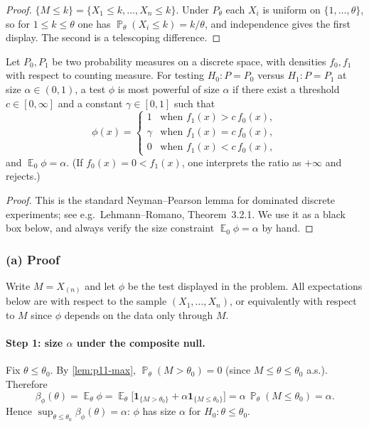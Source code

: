 \documentclass[11pt,a4paper]{article}
\DeclareMathOperator{\E}{\mathbb{E}}
\DeclareMathOperator{\Pbb}{\mathbb{P}}
\begin{document}
\begin{proof}
\(\{M\le k\}=\{X_1\le k,\dots,X_n\le k\}\). Under \(P_\theta\) each \(X_i\) is uniform on \(\{1,\dots,\theta\}\), so for \(1\le k\le\theta\) one has \(\Pbb_\theta(X_i\le k)=k/\theta\), and independence gives the first display. The second is a telescoping difference.
\end{proof}

\begin{lemma}
\label{lem:p11-NP}
Let \(P_0,P_1\) be two probability measures on a discrete space, with densities \(f_0,f_1\) with respect to counting measure. For testing \(H_0:P=P_0\) versus \(H_1:P=P_1\) at size \(\alpha\in(0,1)\), a test \(\phi\) is most powerful of size \(\alpha\) if there exist a threshold \(c\in[0,\infty]\) and a constant \(\gamma\in[0,1]\) such that
\[
\phi(x)
=
\begin{cases}
1 & \text{when }f_1(x)>c\,f_0(x),\\
\gamma & \text{when }f_1(x)=c\,f_0(x),\\
0 & \text{when }f_1(x)<c\,f_0(x),
\end{cases}
\]
and \(\E_0\phi=\alpha\). (If \(f_0(x)=0<f_1(x)\), one interprets the ratio as \(+\infty\) and rejects.)
\end{lemma}

\begin{proof}
This is the standard Neyman--Pearson lemma for dominated discrete experiments; see e.g.\ Lehmann--Romano, Theorem~3.2.1. We use it as a black box below, and always verify the size constraint \(\E_0\phi=\alpha\) by hand.
\end{proof}

\subsubsection{(a) Proof}

Write \(M=X_{(n)}\) and let \(\phi\) be the test displayed in the problem. All expectations below are with respect to the sample \((X_1,\dots,X_n)\), or equivalently with respect to \(M\) since \(\phi\) depends on the data only through \(M\).

\paragraph{Step 1: size \(\alpha\) under the composite null.}
Fix \(\theta\le\theta_0\). By \cref{lem:p11-max}, \(\Pbb_\theta(M>\theta_0)=0\) (since \(M\le\theta\le\theta_0\) a.s.). Therefore
\[
\beta_\phi(\theta)
=
\E_\theta\phi
=
\E_\theta\bigl[\mathbf{1}_{\{M>\theta_0\}}+\alpha\mathbf{1}_{\{M\le\theta_0\}}\bigr]
=
\alpha\,\Pbb_\theta(M\le\theta_0)
=
\alpha.
\]
Hence \(\sup_{\theta\le\theta_0}\beta_\phi(\theta)=\alpha\): \(\phi\) has size \(\alpha\) for \(H_0:\theta\le\theta_0\).
\end{document}
